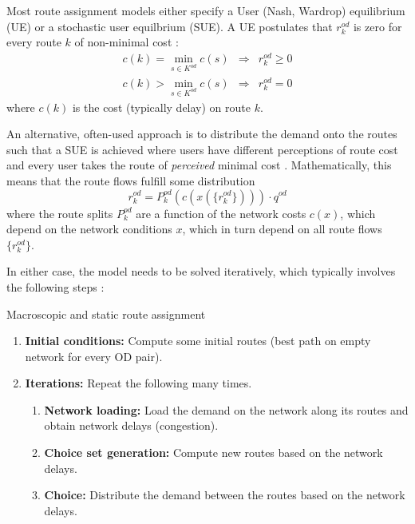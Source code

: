 Most route assignment models either specify a User (Nash, Wardrop) equilibrium (UE) 
or a stochastic user equilbrium (SUE).  
A UE postulates that $r^{od}_k$ is zero for every route $k$ of non-minimal cost \citep{Wardrop1952TheoreticalAspects}:
\begin{eqnarray}
c(k)=\min_{s\in K^{od}}c(s) & \Rightarrow & r^{od}_{k}\geq0\\
c(k)>\min_{s\in K^{od}}c(s) & \Rightarrow & r^{od}_{k}=0
\end{eqnarray}
where $c(k)$ is the cost (typically delay) on route $k$.
 
An alternative, often-used approach is to distribute the demand onto
the routes such that a SUE is
achieved where users have different perceptions of route cost and
every user takes the route of \emph{perceived} minimal cost \citep{daganzo-1977}.
Mathematically, this means that the route flows fulfill some distribution
\begin{equation}
r^{od}_k = P^{od}_k(c(x(\{r^{od}_k\}))) \cdot q^{od}
\label{stoch-equil}
\end{equation}
where the route splits $P^{od}_k$ are a function of the network costs
$c(x)$, which depend on the network conditions $x$,
which in turn depend on all route flows $\{r^{od}_k\}$.

In either case, the model needs to be solved iteratively, 
which typically involves the following steps \citep{sheffi-1985}:

\begin{algorithm}[H]
\label{static-macro-routes}

\caption{Macroscopic and static route assignment}

\begin{enumerate}

\item \textbf{Initial conditions:} Compute some initial routes
  (\eg best path on empty network for every OD pair).

\item \textbf{Iterations:} Repeat the following many times.

\begin{enumerate}

\item \textbf{Network loading:} Load the demand on the network along
  its routes and obtain network delays (congestion).

\item \textbf{Choice set generation:} Compute new routes based on the
  network delays.

\item \textbf{Choice:} Distribute the demand between the routes based
  on the network delays.

\end{enumerate} %

\end{enumerate}

\end{algorithm}

